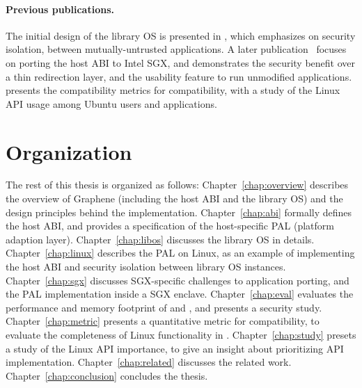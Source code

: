 \paragraph{Previous publications.}
The initial design of the \graphene{} library OS is presented in \cite{tsai14graphene}, which emphasizes on security isolation, between mutually-untrusted applications.
A later publication~\cite{tsai17graphene-sgx} focuses on porting the host ABI
to Intel SGX, and demonstrates the security benefit 
over a thin redirection layer, and the usability feature to run unmodified applications.
\cite{tsai16apistudy} presents the compatibility metrics for compatibility,
with a study of the Linux API usage among Ubuntu users and applications.

\section{Organization}

The rest of this thesis is organized as follows:
Chapter~\ref{chap:overview} describes the overview of Graphene (including the host ABI and the library OS) and the design principles behind the implementation.
Chapter~\ref{chap:abi} formally defines the host ABI, and provides a specification of the host-specific PAL (platform adaption layer).
Chapter~\ref{chap:libos} discusses the library OS in details.
Chapter~\ref{chap:linux} describes the PAL on Linux, as an example of implementing the host ABI and security isolation between library OS instances.
Chapter~\ref{chap:sgx} discusses SGX-specific challenges to application porting, and the PAL implementation inside a SGX enclave.
Chapter~\ref{chap:eval} evaluates the performance and memory footprint of \graphene{} and \graphenesgx{},
and presents a security study.
Chapter~\ref{chap:metric} presents a quantitative metric for compatibility,
to evaluate the completeness of Linux functionality in \graphene{}.
Chapter~\ref{chap:study} presets a study of the Linux API importance, to give an insight about prioritizing API implementation.
Chapter~\ref{chap:related} discusses the related work.
Chapter~\ref{chap:conclusion} concludes the thesis.
